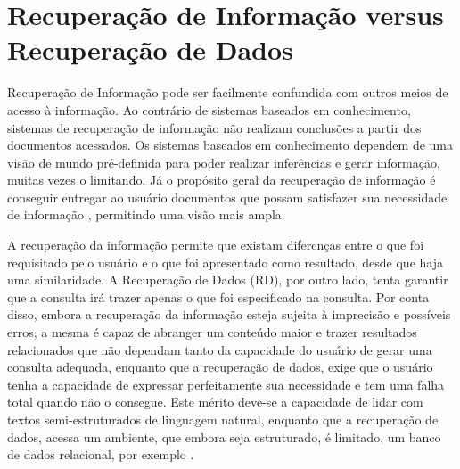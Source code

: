 \section{Recuperação de Informação versus Recuperação de Dados}
Recuperação de Informação pode ser facilmente confundida com outros meios de acesso à informação. Ao contrário de sistemas baseados em conhecimento, sistemas de recuperação de informação não realizam conclusões a partir dos documentos acessados. Os sistemas baseados em conhecimento dependem de uma visão de mundo pré-definida para poder realizar inferências e gerar informação, muitas vezes o limitando. Já o propósito geral da recuperação de informação é conseguir entregar ao usuário documentos que possam satisfazer sua necessidade de informação \citep{Ruthven2003}, permitindo uma visão mais ampla.

A recuperação da informação permite que existam diferenças entre o que foi requisitado pelo usuário e o que foi apresentado como resultado, desde que haja uma similaridade. A Recuperação de Dados (\ac{RD}), por outro lado, tenta garantir que a consulta irá trazer apenas o que foi especificado na consulta. Por conta disso, embora a recuperação da informação esteja sujeita à imprecisão e possíveis erros, a mesma é capaz de abranger um conteúdo maior e trazer resultados relacionados que não dependam tanto da capacidade do usuário de gerar uma consulta adequada, enquanto que a recuperação de dados, exige que o usuário tenha a capacidade de expressar perfeitamente sua necessidade e tem uma falha total quando não o consegue. Este mérito deve-se a capacidade de lidar com textos semi-estruturados de linguagem natural, enquanto que a recuperação de dados, acessa um ambiente, que embora seja estruturado, é limitado, um banco de dados relacional, por exemplo \cite{Fred2008}.

